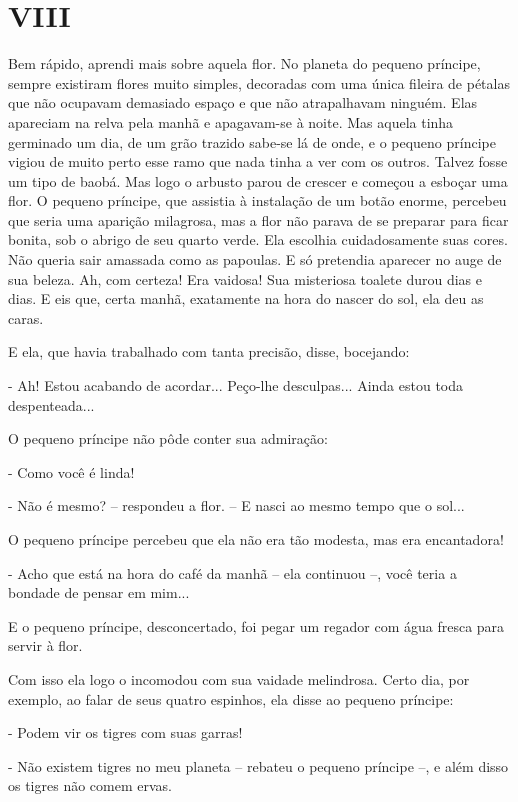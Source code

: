 \chapter{VIII}

Bem rápido, aprendi mais sobre aquela flor. No planeta do pequeno
príncipe, sempre existiram flores muito simples, decoradas com uma única
fileira de pétalas que não ocupavam demasiado espaço e que não
atrapalhavam ninguém. Elas apareciam na relva pela manhã e apagavam-se à
noite. Mas aquela tinha germinado um dia, de um grão trazido sabe-se lá
de onde, e o pequeno príncipe vigiou de muito perto esse ramo que nada
tinha a ver com os outros. Talvez fosse um tipo de baobá. Mas logo o
arbusto parou de crescer e começou a esboçar uma flor. O pequeno
príncipe, que assistia à instalação de um botão enorme, percebeu que
seria uma aparição milagrosa, mas a flor não parava de se preparar para
ficar bonita, sob o abrigo de seu quarto verde. Ela escolhia
cuidadosamente suas cores. Não queria sair amassada como as papoulas. E
só pretendia aparecer no auge de sua beleza. Ah, com certeza! Era
vaidosa! Sua misteriosa toalete durou dias e dias. E eis que, certa
manhã, exatamente na hora do nascer do sol, ela deu as caras.

E ela, que havia trabalhado com tanta precisão, disse, bocejando:

- Ah! Estou acabando de acordar... Peço-lhe desculpas... Ainda estou
toda despenteada...

O pequeno príncipe não pôde conter sua admiração:

- Como você é linda!

- Não é mesmo? -- respondeu a flor. -- E nasci ao mesmo tempo que o
sol...

O pequeno príncipe percebeu que ela não era tão modesta, mas era
encantadora!

- Acho que está na hora do café da manhã -- ela continuou --, você teria
a bondade de pensar em mim...

E o pequeno príncipe, desconcertado, foi pegar um regador com água
fresca para servir à flor.

Com isso ela logo o incomodou com sua vaidade melindrosa. Certo dia, por
exemplo, ao falar de seus quatro espinhos, ela disse ao pequeno
príncipe:

- Podem vir os tigres com suas garras!

- Não existem tigres no meu planeta -- rebateu o pequeno príncipe --, e
além disso os tigres não comem ervas.

